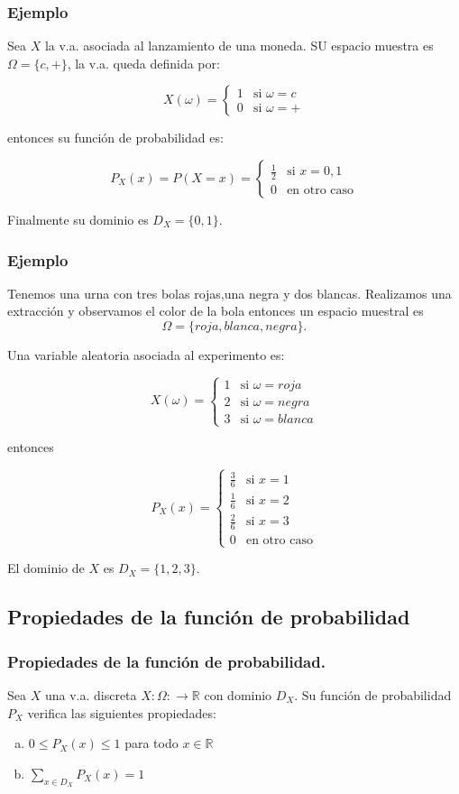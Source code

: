 \documentclass[handout]{beamer}\usepackage[]{graphicx}\usepackage[]{color}
\newcommand{\RR}{\mathbb{R}}
\renewcommand{\leq}{\leqslant}
\theoremstyle{plain}
\theoremstyle{definition}
\begin{document}
\begin{frame}

\frametitle{Ejemplo}
Sea $X$ la v.a. asociada al lanzamiento de una moneda. SU espacio muestra es  $\Omega=\{c,+\}$, la v.a. queda definida por:

$$X(\omega)=\left\{\begin{array}{ll} 1 & \mbox{si } \omega=c \\
0 & \mbox{si }\omega=+\end{array}\right.$$

entonces su función de probabilidad es:

$$P_{X}(x)=P(X=x)=\left\{\begin{array}{ll} \frac{1}{2} & \mbox{si } x=0,1\\
0 & \mbox{en otro caso}\end{array}\right.$$


Finalmente su dominio es $D_X=\{0,1\}.$
\end{frame}



\begin{frame}
\frametitle{Ejemplo} 
Tenemos una urna con tres bolas rojas,una negra y dos blancas. Realizamos una extracción y observamos el color de la bola entonces un espacio muestral es
$$\Omega=\{roja, blanca, negra\}.$$ 

Una variable aleatoria asociada al experimento es:

$$X(\omega)=\left\{\begin{array}{ll} 1 & \mbox{si } \omega=roja  \\
2 & \mbox{si }\omega=negra \\ 3 & \mbox{si } \omega=blanca \end{array}\right.$$

entonces

$$P_{X}(x)=\left\{\begin{array}{ll} \frac{3}{6} & \mbox{si } x=1\\
\frac{1}{6} & \mbox{si } x=2\\ \frac{2}{6} & \mbox{si } x=3\\ 0 & \mbox{en otro
caso}\end{array}\right.$$

El dominio de $X$ es $D_X=\{1,2,3\}.$

\end{frame}

\subsection{Propiedades de la función de probabilidad}
\begin{frame}

\frametitle{Propiedades de la función de probabilidad.}
 Sea $X$ una v.a. discreta $X:\Omega:\to\RR$ con dominio $D_X$. Su función de probabilidad $P_{X}$ verifica las siguientes propiedades:
\begin{enumerate}[a)]
\item $0\leq P_{X}(x)\leq 1$ para todo $x\in\RR$
\item $\sum\limits_{x\in D_X} P_{X}(x)=1$
\end{enumerate}
\end{frame}
\end{document}
